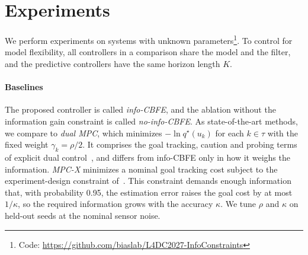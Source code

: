 \documentclass{l4dc2027}
\newcommand\given[1][]{\,#1\vert\,}
\newcommand{\E}{\mathbb{E}}
\begin{document}


\section{Experiments}\label{sec:experiments}

We perform experiments on systems with unknown parameters\footnote{Code: \url{https://github.com/biaslab/L4DC2027-InfoConstraints}}. To control for model flexibility, all controllers in a comparison share the model and the filter, and the predictive controllers have the same horizon length $K$. 

\paragraph{Baselines}
The proposed controller is called \emph{info-CBFE}, and the ablation without the information gain constraint is called \emph{no-info-CBFE}. As state-of-the-art methods, we compare to \emph{dual MPC}, which minimizes $-\ln q^{\star}(u_k)$ for each $k \in \tau$ with the fixed weight $\gamma_k = \rho/2$. It comprises the goal tracking, caution and probing terms of explicit dual control~\citep{mesbah2018stochastic,heirung2017dual}, and differs from info-CBFE only in how it weighs the information. \emph{MPC-X} minimizes a nominal goal tracking cost subject to the experiment-design constraint of~\citet{larsson2013model}. This constraint demands enough information that, with probability 0.95, the estimation error raises the goal cost by at most $1/\kappa$, so the required information grows with the accuracy $\kappa$. We tune $\rho$ and $\kappa$ on held-out seeds at the nominal sensor noise.
\end{document}
